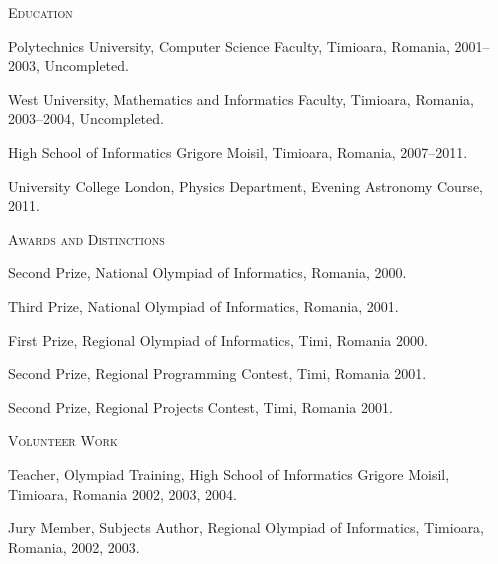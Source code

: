 \documentclass[10pt]{article}
\begin{document}
\newpage

\vspace{0.16in}

\noindent
\textcolor{Primary}{{\large \textsc{Education}}}
\begin{list}{}{\leftmargin=0em}
  \setlength{\itemsep}{1pt}
  \setlength{\parskip}{0pt}
  \setlength{\parsep}{0pt}
  \item Polytechnics University, Computer Science Faculty, Timioara, Romania, 2001--2003, Uncompleted.
  \item West University, Mathematics and Informatics Faculty, Timioara, Romania, 2003--2004, Uncompleted.
  \item High School of Informatics Grigore Moisil, Timioara, Romania, 2007--2011.
  \item University College London, Physics Department, Evening Astronomy Course, 2011.
\end{list}

\vspace{0.16in}

\noindent
\textcolor{Primary}{{\large \textsc{Awards and Distinctions}}}
\begin{list}{}{\leftmargin=0em}
  \setlength{\itemsep}{1pt}
  \setlength{\parskip}{0pt}
  \setlength{\parsep}{0pt}
  \item{Second Prize, National Olympiad of Informatics, Romania, 2000.}
  \item{Third Prize, National Olympiad of Informatics, Romania, 2001.}
  \item{First Prize, Regional Olympiad of Informatics, Timi, Romania 2000.}
  \item{Second Prize, Regional Programming Contest, Timi, Romania 2001.}
  \item{Second Prize, Regional Projects Contest, Timi, Romania 2001.}
\end{list}

\vspace{0.16in}

\noindent
\textcolor{Primary}{{\large \textsc{Volunteer Work}}}
\begin{list}{}{\leftmargin=0em}
  \setlength{\itemsep}{1pt}
  \setlength{\parskip}{0pt}
  \setlength{\parsep}{0pt}
  \item{Teacher, Olympiad Training, High School of Informatics Grigore Moisil, Timioara, Romania 2002, 2003, 2004.}
  \item{Jury Member, Subjects Author, Regional Olympiad of Informatics, Timioara, Romania, 2002, 2003.}
\end{list}
\end{document}
